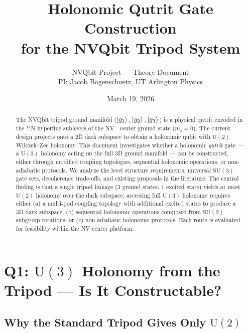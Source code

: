 \documentclass[11pt,letterpaper]{article}
\title{Holonomic Qutrit Gate Construction\\for the NVQbit Tripod System}
\author{NVQbit Project — Theory Document\\PI: Jacob Bogenschuetz, UT Arlington Physics}
\date{March 19, 2026}
\newcommand{\SU}{\mathrm{SU}}
\newcommand{\UU}{\mathrm{U}}
\begin{document}
\maketitle

\begin{abstract}
The NVQbit tripod ground manifold ($\ket{g_1}, \ket{g_2}, \ket{g_3}$) is a physical qutrit
encoded in the $^{14}$N hyperfine sublevels of the NV$^-$ center ground state ($m_s = 0$).
The current design projects onto a 2D dark subspace to obtain a holonomic qubit with
$\UU(2)$ Wilczek--Zee holonomy. This document investigates whether a holonomic
\emph{qutrit} gate --- a $\UU(3)$ holonomy acting on the full 3D ground manifold --- can be
constructed, either through modified coupling topologies, sequential holonomic operations,
or non-adiabatic protocols. We analyze the level structure requirements, universal $\SU(3)$
gate sets, decoherence trade-offs, and existing proposals in the literature. The central
finding is that a single tripod linkage (3 ground states, 1 excited state) yields at most
$\UU(2)$ holonomy over the dark subspace; accessing full $\UU(3)$ holonomy requires either
(a) a multi-pod coupling topology with additional excited states to produce a 3D dark
subspace, (b) sequential holonomic operations composed from $\SU(2)$ subgroup rotations,
or (c) non-adiabatic holonomic protocols. Each route is evaluated for feasibility within
the NV center platform.
\end{abstract}

\tableofcontents
\newpage

\section{Q1: $\UU(3)$ Holonomy from the Tripod --- Is It Constructable?}
\label{sec:Q1}

\subsection{Why the Standard Tripod Gives Only $\UU(2)$}
\end{document}
